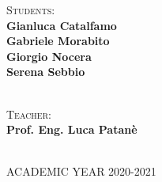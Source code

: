 \begin{titlepage}
\begin{minipage}[t]{0.8\textwidth}
\begin{center}
\end{center}
\end{minipage}

\vfill
\par
\noindent
\begin{minipage}[t]{0.47\textwidth}
	{\large{\textsc {Students:}} \\
		{\textbf{Gianluca Catalfamo}}\\
		{\textbf{Gabriele Morabito}}\\ 
		{\textbf{Giorgio Nocera}}\\
		{\textbf{Serena Sebbio}}\\
		} \\
\end{minipage}
\hfill
\begin{minipage}[t]{0.47\textwidth}\raggedleft
	{\large{\textsc{Teacher:}}} \\
		{\textbf{Prof. Eng. Luca Patanè}} \\
\end{minipage}
\vspace{15mm}


\begin{center}
    \HRule\\[0.5cm]
	{ACADEMIC YEAR 2020-2021}
\end{center}

\end{titlepage}

\doublespacing %